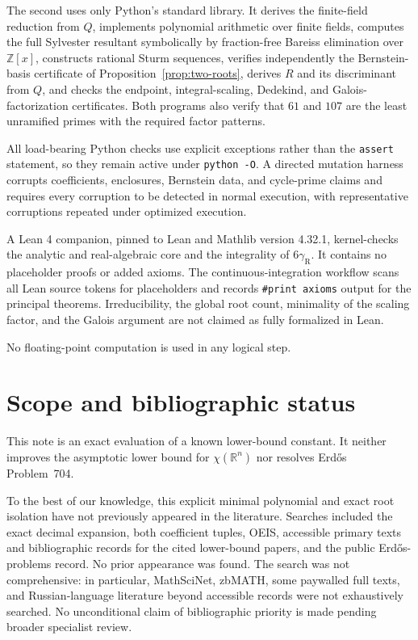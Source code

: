 \documentclass[11pt]{article}
\theoremstyle{remark}
\newcommand{\gR}{\gamma_{\mathrm R}}
\begin{document}
The second uses only Python's standard library. It derives the finite-field reduction from \(Q\), implements polynomial arithmetic over finite fields, computes the full Sylvester resultant symbolically by fraction-free Bareiss elimination over \(\mathbb Z[x]\), constructs rational Sturm sequences, verifies independently the Bernstein-basis certificate of Proposition~\ref{prop:two-roots}, derives \(R\) and its discriminant from \(Q\), and checks the endpoint, integral-scaling, Dedekind, and Galois-factorization certificates. Both programs also verify that \(61\) and \(107\) are the least unramified primes with the required factor patterns.

All load-bearing Python checks use explicit exceptions rather than the \texttt{assert} statement, so they remain active under \texttt{python -O}. A directed mutation harness corrupts coefficients, enclosures, Bernstein data, and cycle-prime claims and requires every corruption to be detected in normal execution, with representative corruptions repeated under optimized execution.

A Lean 4 companion, pinned to Lean and Mathlib version 4.32.1, kernel-checks the analytic and real-algebraic core and the integrality of \(6\gR\). It contains no placeholder proofs or added axioms. The continuous-integration workflow scans all Lean source tokens for placeholders and records \texttt{\#print axioms} output for the principal theorems. Irreducibility, the global root count, minimality of the scaling factor, and the Galois argument are not claimed as fully formalized in Lean.

No floating-point computation is used in any logical step.

\section{Scope and bibliographic status}
This note is an exact evaluation of a known lower-bound constant. It neither improves the asymptotic lower bound for \(\chi(\mathbb R^n)\) nor resolves Erd\H{o}s Problem~704.

To the best of our knowledge, this explicit minimal polynomial and exact root isolation have not previously appeared in the literature. Searches included the exact decimal expansion, both coefficient tuples, OEIS, accessible primary texts and bibliographic records for the cited lower-bound papers, and the public Erd\H{o}s-problems record. No prior appearance was found. The search was not comprehensive: in particular, MathSciNet, zbMATH, some paywalled full texts, and Russian-language literature beyond accessible records were not exhaustively searched. No unconditional claim of bibliographic priority is made pending broader specialist review.
\end{document}
